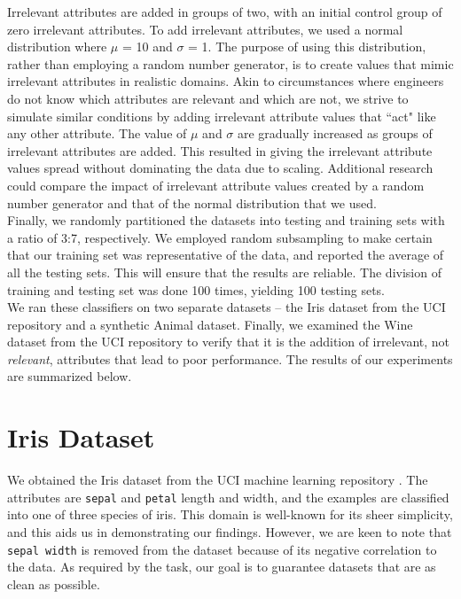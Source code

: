 \documentclass{article}
\begin{document}
Irrelevant attributes are added in groups of two, with an initial control group of zero irrelevant attributes. To add irrelevant attributes, we used a normal distribution where $\mu$ = 10 and $\sigma$ = 1. The purpose of using this distribution, rather than employing a random number generator, is to create values that mimic irrelevant attributes in realistic domains. Akin to circumstances where engineers do not know which attributes are relevant and which are not, we strive to simulate similar conditions by adding irrelevant attribute values that ``act" like any other attribute. The value of $\mu$ and $\sigma$ are gradually increased as groups of irrelevant attributes are added. This resulted in giving the irrelevant attribute values spread without dominating the data due to scaling. Additional research could compare the impact of irrelevant attribute values created by a random number generator and that of the normal distribution that we used.  \\

Finally, we randomly partitioned the datasets into testing and training sets with a ratio of 3:7, respectively. We employed random subsampling to make certain that our training set was representative of the data, and reported the average of all the testing sets. This will ensure that the results are reliable. The division of training and testing set was done 100 times, yielding 100 testing sets. \\   

We ran these classifiers on two separate datasets -- the Iris dataset from the UCI repository and a synthetic Animal dataset. Finally, we examined the Wine dataset from the UCI repository to verify that it is the addition of irrelevant, not \textit{relevant}, attributes that lead to poor performance.  The results of our experiments are summarized below.

\section{Iris Dataset}

We obtained the Iris dataset from the UCI machine learning repository \cite{iris}. The attributes are \texttt{sepal} and \texttt{petal} length and width, and the examples are classified into one of three species of iris. This domain is well-known for its sheer simplicity, and this aids us in demonstrating our findings. However, we are keen to note that \texttt{sepal width} is removed from the dataset because of its negative correlation to the data. As required by the task, our goal is to guarantee datasets that are as clean as possible. \\ 
\end{document}
